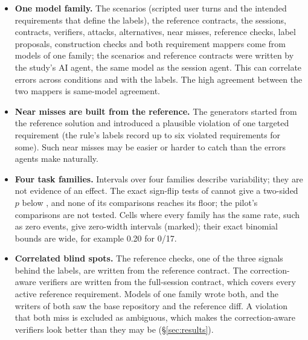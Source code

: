 \begin{itemize}
\item \textbf{One model family.} The scenarios (scripted user turns and the intended requirements that define the labels), the reference contracts, the sessions, contracts, verifiers, attacks, alternatives, near misses, reference checks, label proposals, construction checks and both requirement mappers come from models of one family; the scenarios and reference contracts were written by the study's AI agent, the same model as the session agent. This can correlate errors across conditions and with the labels. The high agreement between the two mappers is same-model agreement.
\item \textbf{Near misses are built from the reference.} The generators started from the reference solution and introduced a plausible violation of one targeted requirement (the rule's labels record up to six violated requirements for some). Such near misses may be easier or harder to catch than the errors agents make naturally.
\item \textbf{Four task families.} Intervals over four families describe variability; they are not evidence of an effect. The exact sign-flip tests of \texttt{\FRESHRUN} cannot give a two-sided $p$ below , and none of its comparisons reaches its floor; the pilot's comparisons are not tested. Cells where every family has the same rate, such as zero events, give zero-width intervals (marked); their exact binomial bounds are wide, for example 0.20 for 0/17.
\item \textbf{Correlated blind spots.} The reference checks, one of the three signals behind the labels, are written from the reference contract. The correction-aware verifiers are written from the full-session contract, which covers every active reference requirement. Models of one family wrote both, and the writers of both saw the base repository and the reference diff. A violation that both miss is excluded as ambiguous, which makes the correction-aware verifiers look better than they may be (\S\ref{sec:results}).

\end{itemize}
